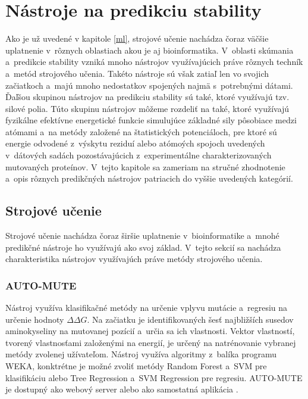 \chapter{Nástroje na predikciu stability}

Ako je už uvedené v kapitole \ref{ml}, strojové učenie nachádza čoraz väčšie uplatnenie v~rôznych oblastiach akou je aj bioinformatika. V~oblasti skúmania a~predikcie stability vzniká mnoho nástrojov využívajúcich práve rôznych techník a~metód strojového učenia. Takéto nástroje sú však zatiaľ len vo svojich začiatkoch a~majú mnoho nedostatkov spojených najmä s~potrebnými dátami. Ďaľšou skupinou nástrojov na predikciu stability sú také, ktoré využívajú tzv. silové polia. Túto skupinu nástrojov môžeme rozdeliť na také, ktoré využívajú fyzikálne efektívne energetické funkcie simulujúce základné sily pôsobiace medzi atómami a~na metódy založené na štatistických potenciáloch, pre ktoré sú energie odvodené z~výskytu reziduí alebo atómoých spojoch uvedených v~dátových sadách pozostávajúcich z~experimentálne charakterizovaných mutovaných proteínov.
V~tejto kapitole sa zameriam na stručné zhodnotenie a~opis rôznych predikčných nástrojov patriacich do vyššie uvedených kategórií.

\section{Strojové učenie}

Strojové učenie nachádza čoraz širšie uplatnenie v~bioinformatike a~mnohé predikčné nástroje ho využívajú ako svoj základ. V~tejto sekcií sa nachádza charakteristika nástrojov využívajúch práve metódy strojového učenia.

\subsection{AUTO-MUTE}

Nástroj využíva klasifikačné metódy na určenie vplyvu mutácie a~regresiu na určenie hodnoty $\Delta\Delta G$.
Na začiatku je identifikovaných šesť najbližších susedov aminokyseliny na mutovanej pozícií a~určia sa ich vlastnosti. Vektor vlastností, tvorený vlastnosťami založenými na energií, je určený na natrénovanie vybranej metódy zvolenej užívateľom. Nástroj využíva algoritmy z~balíka programu WEKA, konktrétne je možné zvoliť metódy Random Forest a~SVM pre klasifikáciu alebo Tree Regression a~SVM Regression pre regresiu. AUTO-MUTE je dostupný ako webový server alebo ako samostatná aplikácia \cite{automute}.

